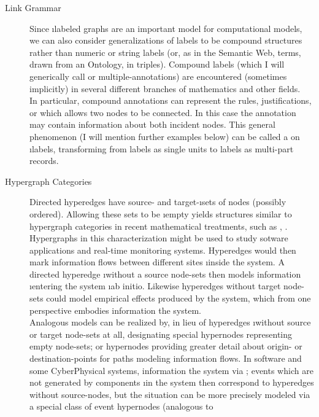 {\begin{description}
\item[Link Grammar]   Since \i{labeled} 
graphs are an important model for computational models, 
we can also consider generalizations of labels to be 
compound structures rather than numeric or string labels 
(or, as in the Semantic Web,  terms,  
drawn from an Ontology, in  
triples).  Compound labels (which I will generically call 
 or multiple-annotations) are encountered (sometimes implicitly) 
in several different branches of mathematics and other fields.  
\\\hspace*{3em}
In particular, compound annotations can represent the 
rules, justifications, or  which allows 
two nodes to be connected.   In this case the annotation 
may contain information about both incident nodes.  
This general phenomenon (I will mention further examples 
below) can be called a  
on \i{labels}, transforming from labels as single units 
to labels as multi-part records.
\item[Hypergraph Categories]  Directed hyperedges have source- 
and target-\i{sets} of nodes (possibly ordered).  Allowing 
these sets to be \i{empty} yields structures similar to 
hypergraph categories in recent mathematical treatments, such 
as \cite{BrendanFong}, \cite{AleksKissinger}.  Hypergraphs 
in this characterization might be used to study sotware applications 
and real-time monitoring systems.  Hyperedges would then 
mark information flows between different sites \i{inside} the 
system.  A directed hyperedge \i{without} a source node-sets then 
models information \i{entering} the system \i{ab initio}.  
Likewise hyperedges without target node-sets could model 
empirical effects produced by the system, which from one 
perspective embodies information  the system.
\\\hspace*{3em}
Analogous models can be realized by, in lieu of 
hyperedges \i{without} source or target node-sets at all, 
designating special hypernodes representing empty 
node-sets; or hypernodes providing greater detail about 
origin- or destination-points for paths modeling 
information flows.  In software and some CyberPhysical 
systems, information  the system via 
; events which are not generated by components \i{in} the 
system then correspond to hyperedges without source-nodes, 
but the situation can be more precisely modeled via a 
special class of event hypernodes (analogous to 

\end{description}}
